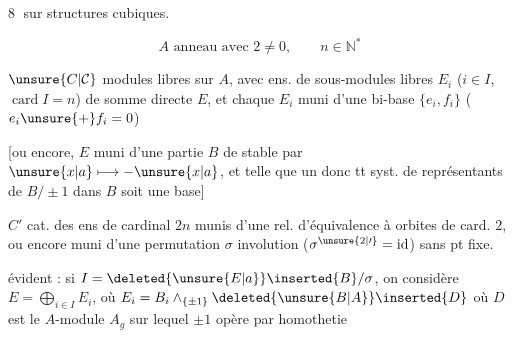 \textcircled{8}  sur structures cubiques.

\[
 A\text{ anneau avec }2\ne0,\qquad n\in\mathbb{N}^{*}
\]

$\unsure{C|\mathcal{C}}$  modules libres  sur $A$, avec  ens. de  sous-modules libres $E_i$ ($i\in I$, $\operatorname{card} I=n$) de somme directe $E$, et chaque $E_i$ muni d'une bi-base $\{e_i,f_i\}$ ($e_i\unsure{+}f_i=0$)

[ou encore, $E$ muni d'une partie $B$ de  stable par $\unsure{x|a}\longmapsto-\unsure{x|a}$, et telle que un \textendash{} donc tt \textendash{} syst. de représentants de $B/\pm1$ dans $B$ soit une base]

\diagram{\begin{tikzcd}[ampersand replacement=\&,row sep=small]
 {}\arrow[d,"\wr"']\\ {}
\end{tikzcd}}
$C'$ cat. des ens  de cardinal $2n$ munis d'une rel. d'équivalence  à orbites de card. $2$, ou encore muni d'une permutation $\sigma$ involution ($\sigma^{\unsure{2|\prime}}=\mathrm{id}$) sans pt fixe.

 évident
 : si $I=\deleted{\unsure{E|a}}\inserted{B}/\sigma$, on
considère $E=\bigoplus_{i\in I}E_i$, où $E_i=B_i\wedge_{\{\pm1\}}\deleted{\unsure{B|A}}\inserted{D}$ où $D$ est le $A$-module $A_g$ sur lequel $\pm1$ opère par homothetie

